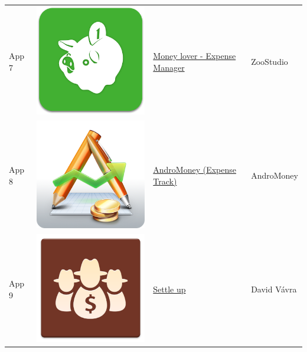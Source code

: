 \begin{table}
\begin{tabular}{ | l | c | l | l | }
App 7 & \includegraphics[scale=0.05]{A07_icon.png} & \href{https://play.google.com/store/apps/details?id=com.bookmark.money}{Money lover - Expense Manager} & ZooStudio   \\

App 8 & \includegraphics[scale=0.05]{A08_icon.png} & \href{https://play.google.com/store/apps/details?id=com.kpmoney.android}{AndroMoney (Expense Track)} & AndroMoney \\

App 9 & \includegraphics[scale=0.05]{A10_icon.png} & \href{https://play.google.com/store/apps/details?id=cz.destil.settleup}{Settle up} & David Vávra \\


\end{tabular}
\end{table}
